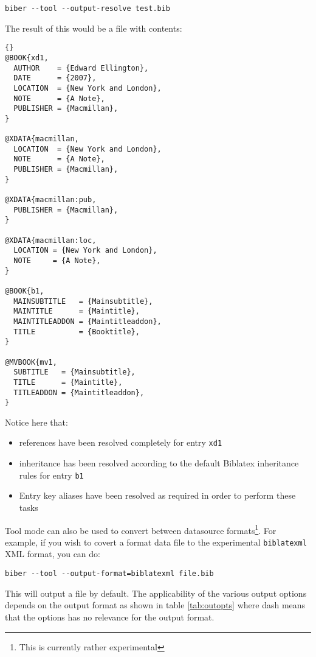 \documentclass{ltxdockit}
\newcommand*{\biblatex}{Biblatex\xspace}
\begin{document}
\begin{verbatim}
biber --tool --output-resolve test.bib
\end{verbatim}
%
The result of this would be a file  with contents:

\begin{lstlisting}[style=bibtex, columns=fixed]{}
@BOOK{xd1,
  AUTHOR    = {Edward Ellington},
  DATE      = {2007},
  LOCATION  = {New York and London},
  NOTE      = {A Note},
  PUBLISHER = {Macmillan},
}

@XDATA{macmillan,
  LOCATION  = {New York and London},
  NOTE      = {A Note},
  PUBLISHER = {Macmillan},
}

@XDATA{macmillan:pub,
  PUBLISHER = {Macmillan},
}

@XDATA{macmillan:loc,
  LOCATION = {New York and London},
  NOTE     = {A Note},
}

@BOOK{b1,
  MAINSUBTITLE   = {Mainsubtitle},
  MAINTITLE      = {Maintitle},
  MAINTITLEADDON = {Maintitleaddon},
  TITLE          = {Booktitle},
}

@MVBOOK{mv1,
  SUBTITLE   = {Mainsubtitle},
  TITLE      = {Maintitle},
  TITLEADDON = {Maintitleaddon},
}
\end{lstlisting}
%
Notice here that:
\begin{itemize}
\item {} references have been resolved completely for entry
  \texttt{xd1}
\item {} inheritance has been resolved according to the
  default \biblatex inheritance rules for entry \texttt{b1}
\item Entry key aliases have been resolved as required in order to perform
  these tasks
\end{itemize}

Tool mode can also be used to convert between datasource
formats\footnote{This is currently rather experimental}. For example,
if you wish to covert a \bibtex format data file to the experimental
\texttt{biblatexml} XML format, you can do:

\begin{verbatim}
biber --tool --output-format=biblatexml file.bib
\end{verbatim}

\noindent This will output a file  by
default. The applicability of the various output options depends on
the output format as shown in table \ref{tab:outopts} where dash means that
the options has no relevance for the output format.
\end{document}
